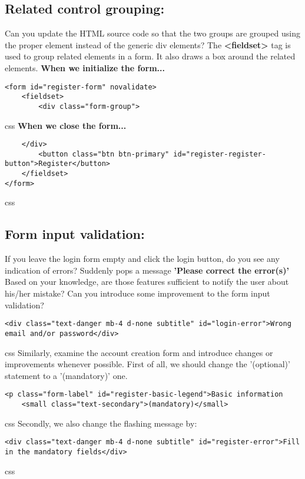 \documentclass[a4paper,11pt]{article}
\theoremstyle{mytheor}
\begin{document}
\subsection{{\textbf{Related control grouping}}:}
Can you update the HTML source code so that the two groups are
grouped using the proper element instead of the generic div elements?
\newline
The {\textbf{<fieldset>}} tag is used to group related elements in a form. It also draws a box around the related elements.
\newline
{\textbf{When we initialize the form...}}
\begin{verbatim}
<form id="register-form" novalidate>
    <fieldset>
        <div class="form-group">
\end{verbatim}{css}
\endline
{\textbf{When we close the form...}}
\begin{verbatim}
    </div>
        <button class="btn btn-primary" id="register-register-button">Register</button>
    </fieldset>
</form>
\end{verbatim}{css}

\subsection{{\textbf{Form input validation}}:}
If you leave the login form empty and click the login button, do you see any indication of errors?
\newline 
Suddenly pops a message {{\textbf{'Please correct the error(s)'}}}
\newline
Based on your
knowledge, are those features sufficient to notify the user about his/her mistake?
Can you introduce some
improvement to the form input validation?
\newline
\begin{verbatim}
<div class="text-danger mb-4 d-none subtitle" id="login-error">Wrong email and/or password</div>
\end{verbatim}{css}
Similarly, examine the account creation form and introduce changes or improvements whenever possible.
\newline
First of all, we should change the '(optional)' statement to a '(mandatory)' one.
\begin{verbatim}
<p class="form-label" id="register-basic-legend">Basic information
    <small class="text-secondary">(mandatory)</small>
\end{verbatim}{css}
\newline
Secondly, we also change the flashing message by:
\begin{verbatim}
<div class="text-danger mb-4 d-none subtitle" id="register-error">Fill in the mandatory fields</div>
\end{verbatim}{css}
\newpage
\end{document}
